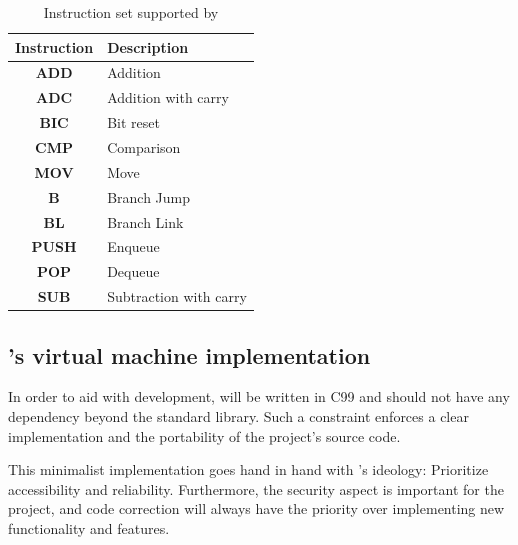 \documentclass[11pt,twoside]{article}
\begin{document}
  \begin{table}
    \begin{centering}
      \begin{tabular}{|c|l|}
        \hline
      \textbf{Instruction} & \textbf{Description}                \\
      \hline
      \hline
      \textbf{ADD}         & Addition                            \\
      \hline
      \textbf{ADC}         & Addition with carry               \\
      \hline
      \textbf{BIC}         & Bit reset                          \\
      \hline
      \textbf{CMP}         & Comparison                         \\
      \hline
      \textbf{MOV}         & Move \\
      \hline
      \textbf{B}           & Branch Jump                \\
      \hline
      \textbf{BL}          & Branch Link                  \\
      \hline
      \textbf{PUSH}        & Enqueue                             \\
      \hline
      \textbf{POP}         & Dequeue                             \\
      \hline
      \textbf{SUB}         & Subtraction with carry           \\
      \hline
      \end{tabular}
    \end{centering}
    \caption{Instruction set supported by }
    \label{tab:instructions}
  \end{table}

  \subsection{'s virtual machine implementation}

  In order to aid with development,  will be written in C99 and should not have any dependency beyond the standard library. Such a constraint enforces a clear implementation and the portability of the project's source code.

  This minimalist implementation goes hand in hand with 's ideology: Prioritize accessibility and reliability. Furthermore, the security aspect is important for the project, and code correction will always have the priority over implementing new functionality and features.
\end{document}
